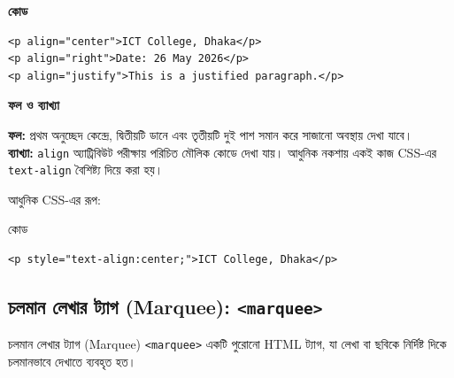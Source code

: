 \par\noindent
\begin{minipage}[t]{.54\linewidth}\vspace{0pt}\small
\textbf{\color{chFourTeal}কোড}\par
\begin{verbatim}
<p align="center">ICT College, Dhaka</p>
<p align="right">Date: 26 May 2026</p>
<p align="justify">This is a justified paragraph.</p>
\end{verbatim}

\par\smallskip
\end{minipage}\hfill
\begin{minipage}[t]{.42\linewidth}\vspace{0pt}\small
\textbf{\color{chFourTeal}ফল ও ব্যাখ্যা}\par
\textbf{ফল:} প্রথম অনুচ্ছেদ কেন্দ্রে, দ্বিতীয়টি ডানে এবং তৃতীয়টি দুই পাশ সমান করে সাজানো অবস্থায় দেখা যাবে।\\
\textbf{ব্যাখ্যা:} \texttt{align} অ্যাট্রিবিউট পরীক্ষায় পরিচিত মৌলিক কোডে দেখা যায়। আধুনিক নকশায় একই কাজ CSS-এর \texttt{text-align} বৈশিষ্ট্য দিয়ে করা হয়।
\par\smallskip
\end{minipage}\par


আধুনিক CSS-এর রূপ:

\begin{examplebox}{কোড}
\par\noindent\begin{minipage}{\linewidth}
\begin{verbatim}
<p style="text-align:center;">ICT College, Dhaka</p>
\end{verbatim}
\end{minipage}\par
\end{examplebox}

\subsection{চলমান লেখার ট্যাগ (Marquee): \texttt{<marquee>}}

\begin{definitionbox}{চলমান লেখার ট্যাগ (Marquee)}
\texttt{<marquee>} একটি পুরোনো HTML ট্যাগ, যা লেখা বা ছবিকে নির্দিষ্ট দিকে চলমানভাবে দেখাতে ব্যবহৃত হত।
\end{definitionbox}


